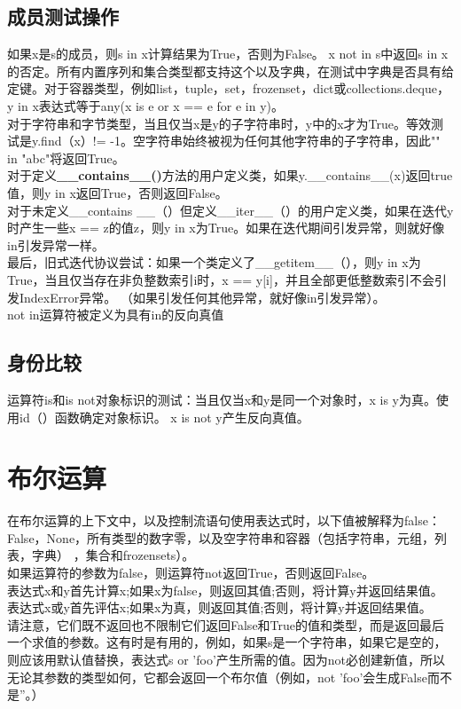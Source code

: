 \documentclass[10pt,UTF8]{ctexart}
\begin{document}
\subsection{成员测试操作}
如果x是s的成员，则s in x计算结果为True，否则为False。 x not in s中返回s in x的否定。所有内置序列和集合类型都支持这个以及字典，在测试中字典是否具有给定键。对于容器类型，例如list，tuple，set，frozenset，dict或collections.deque，y in x表达式等于any(x is e or x == e for e in y)。\\
\indent 对于字符串和字节类型，当且仅当x是y的子字符串时，y中的x才为True。等效测试是y.find（x）!= -1。空字符串始终被视为任何其他字符串的子字符串，因此"" in "abc"将返回True。\\
\indent 对于定义\textbf{__contains__()}方法的用户定义类，如果y.__contains__(x)返回true值，则y in x返回True，否则返回False。\\
\indent 对于未定义__contains __（）但定义__iter__（）的用户定义类，如果在迭代y时产生一些x == z的值z，则y in x为True。如果在迭代期间引发异常，则就好像in引发异常一样。\\
\indent 最后，旧式迭代协议尝试：如果一个类定义了__getitem__（），则y in x为True，当且仅当存在非负整数索引i时，x == y[i]，并且全部更低整数索引不会引发IndexError异常。 （如果引发任何其他异常，就好像in引发异常）。\\
\indent not in运算符被定义为具有in的反向真值
\subsection{身份比较}
运算符is和is not对象标识的测试：当且仅当x和y是同一个对象时，x is y为真。使用id（）函数确定对象标识。 x is not y产生反向真值。

\section{布尔运算}
在布尔运算的上下文中，以及控制流语句使用表达式时，以下值被解释为false：False，None，所有类型的数字零，以及空字符串和容器（包括字符串，元组，列表，字典） ，集合和frozensets）。\\
\indent 如果运算符的参数为false，则运算符not返回True，否则返回False。\\
\indent 表达式x和y首先计算x;如果x为false，则返回其值;否则，将计算y并返回结果值。\\
\indent 表达式x或y首先评估x;如果x为真，则返回其值;否则，将计算y并返回结果值。\\
\indent 请注意，它们既不返回也不限制它们返回False和True的值和类型，而是返回最后一个求值的参数。这有时是有用的，例如，如果s是一个字符串，如果它是空的，则应该用默认值替换，表达式s or 'foo'产生所需的值。因为not必创建新值，所以无论其参数的类型如何，它都会返回一个布尔值（例如，not 'foo'会生成False而不是''。）
\end{document}
